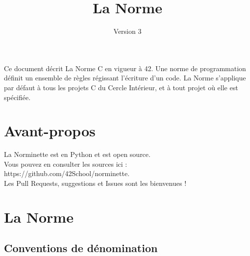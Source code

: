 \documentclass{42-fr}
\begin{document}
\title{La Norme}
\subtitle{Version 3}

\summary
{
    Ce document décrit La Norme C en vigueur à 42. Une norme de programmation 
    définit un ensemble de règles régissant l’écriture d’un code. 
    La Norme s'applique par défaut à tous les projets C du
    Cercle Intérieur, et à tout projet où elle est spécifiée.
    
}

\maketitle

\tableofcontents



\chapter{Avant-propos}

    La Norminette est en Python et est open source.\\
    Vous pouvez en consulter les sources ici : https://github.com/42School/norminette.\\
    Les Pull Requests, suggestions et Issues sont les bienvenues !

\chapter{La Norme}


    \section{Conventions de dénomination}
\end{document}
